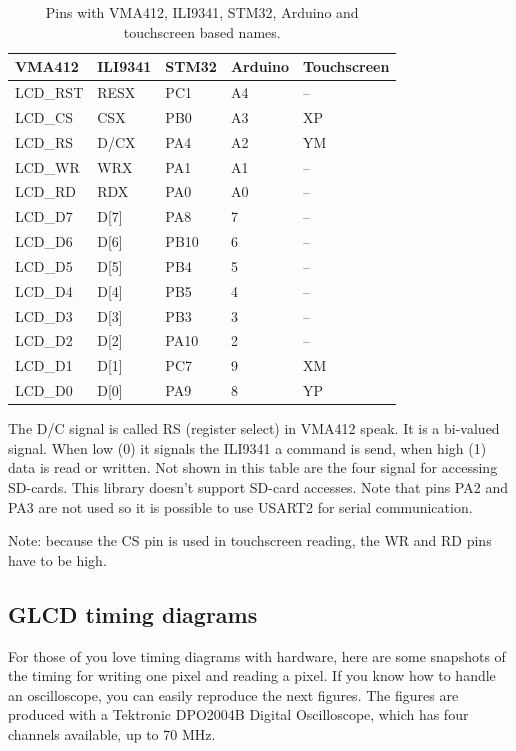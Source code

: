 \documentclass[12pt]{article}
\begin{document}
\begin{table}[!ht]
\centering
\caption{Pins with VMA412, ILI9341, STM32, Arduino and touchscreen based names.}
\label{tab:1}
\begin{tabular}{p{2.5cm}p{2.5cm}p{2.5cm}p{2.5cm}p{2.5cm}}
\toprule
VMA412 & ILI9341 & STM32 & Arduino & Touchscreen \\
\midrule
LCD\_RST & RESX & PC1    & A4 & -- \\
LCD\_CS  & CSX  & PB0    & A3 & XP \\
LCD\_RS  & D/CX & PA4    & A2 & YM \\
LCD\_WR  & WRX  & PA1    & A1 & -- \\
LCD\_RD  & RDX  & PA0    & A0 & -- \\[.8ex]
LCD\_D7  & D[7] & PA8    & 7  & -- \\
LCD\_D6  & D[6] & PB10   & 6  & -- \\
LCD\_D5  & D[5] & PB4    & 5  & -- \\
LCD\_D4  & D[4] & PB5    & 4  & -- \\
LCD\_D3  & D[3] & PB3    & 3  & -- \\
LCD\_D2  & D[2] & PA10   & 2  & -- \\
LCD\_D1  & D[1] & PC7    & 9  & XM \\
LCD\_D0  & D[0] & PA9    & 8  & YP \\
\bottomrule
\end{tabular}
\end{table}

The D/C signal is called RS (register select) in VMA412  speak. It is a bi-valued signal. When low (0) it signals the ILI9341 a command is send, when high (1) data is read or written.
Not shown in this table are the four signal for accessing SD-cards. This library doesn't support SD-card accesses.
Note that pins PA2 and PA3 are not used so it is possible to use USART2 for serial communication.

Note: because the CS pin is used in touchscreen reading, the WR and RD pins have to be high.

\subsection{GLCD timing diagrams}
For those of you love timing diagrams with hardware, here are some snapshots of the timing for writing one pixel and reading a pixel. If you know how to handle an oscilloscope, you can easily reproduce the next figures. The figures are produced with a Tektronic DPO2004B Digital Oscilloscope, which has four channels available, up to 70 MHz.
\end{document}
